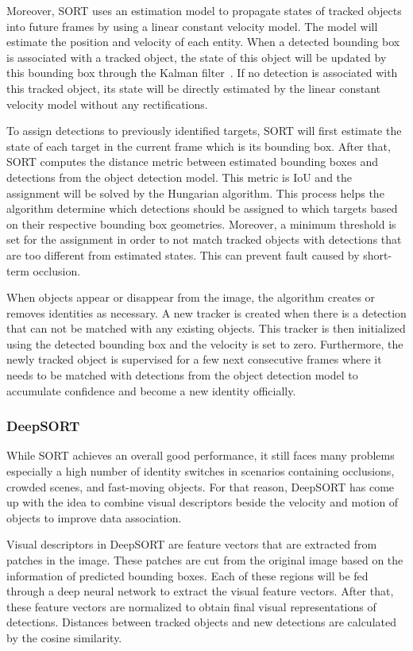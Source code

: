 \documentclass[../main.tex]{subfiles}
\begin{document}
Moreover, SORT uses an estimation model to propagate states of tracked objects into future frames by using a linear constant velocity model. The model will estimate the position and velocity of each entity. When a detected bounding box is associated with a tracked object, the state of this object will be updated by this bounding box through the Kalman filter~\cite{kalman}. If no detection is associated with this tracked object, its state will be directly estimated by the linear constant velocity model without any rectifications.

To assign detections to previously identified targets, SORT will first estimate the state of each target in the current frame which is its bounding box. After that, SORT computes the distance metric between estimated bounding boxes and detections from the object detection model. This metric is IoU and the assignment will be solved by the Hungarian algorithm. This process helps the algorithm determine which detections should be assigned to which targets based on their respective bounding box geometries. Moreover, a minimum threshold is set for the assignment in order to not match tracked objects with detections that are too different from estimated states. This can prevent fault caused by short-term occlusion.

When objects appear or disappear from the image, the algorithm creates or removes identities as necessary. A new tracker is created when there is a detection that can not be matched with any existing objects. This tracker is then initialized using the detected bounding box and the velocity is set to zero. Furthermore, the newly tracked object is supervised for a few next consecutive frames where it needs to be matched with detections from the object detection model to accumulate confidence and become a new identity officially.
\subsubsection{DeepSORT}
\label{subsec:deepsort}
While SORT achieves an overall good performance, it still faces many problems especially a high number of identity switches in scenarios containing occlusions, crowded scenes, and fast-moving objects. For that reason, DeepSORT has come up with the idea to combine visual descriptors beside the velocity and motion of objects to improve data association.

Visual descriptors in DeepSORT are feature vectors that are extracted from patches in the image. These patches are cut from the original image based on the information of predicted bounding boxes. Each of these regions will be fed through a deep neural network to extract the visual feature vectors. After that, these feature vectors are normalized to obtain final visual representations of detections. Distances between tracked objects and new detections are calculated by the cosine similarity. 
\end{document}
